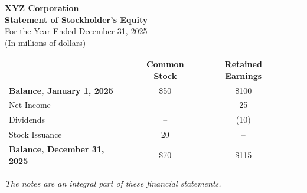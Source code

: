 \begin{tcolorbox}[colframe=black,colback=white,title=Example Statement of Stockholder's Equity]
    \begin{center}
        \textbf{XYZ Corporation}\\
        \textbf{Statement of Stockholder's Equity}\\
        For the Year Ended December 31, 2025\\
        (In millions of dollars)
    \end{center}

    \begin{tabular}{lcccc}
                                            & \textbf{Common Stock}        & \textbf{Retained Earnings}    \\
        \textbf{Balance, January 1, 2025}   & \$50                         & \$100                         \\
        Net Income                          & --                           & 25                            \\
        Dividends                           & --                           & (10)                          \\
        Stock Issuance                      & 20                           & --                            \\
        \textbf{Balance, December 31, 2025} & \underline{\underline{\$70}} & \underline{\underline{\$115}} \\
    \end{tabular}

    \vspace{1em}

    \textit{\footnotesize{The notes are an integral part of these financial statements.}}
\end{tcolorbox}

\normalsize

\newpage
